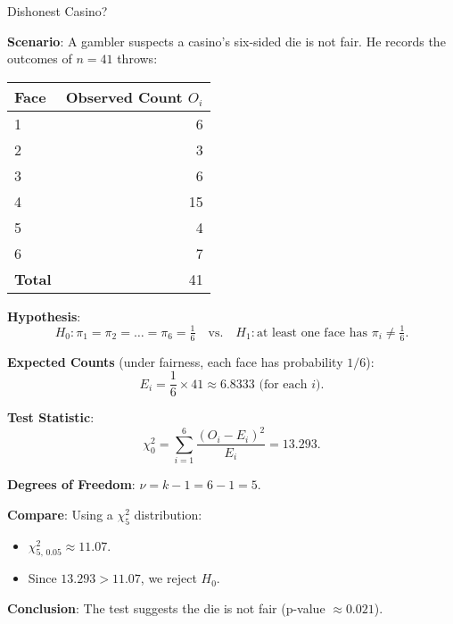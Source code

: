 \documentclass[10pt, total={6in, 8in}]{extarticle}
\begin{document}
\begin{examplebox}{Dishonest Casino?}{}

    \textbf{Scenario}: A gambler suspects a casino's six-sided die is not fair. He records the outcomes of $n=41$ throws:

    \begin{center}
        \begin{tabular}{lr}
            \toprule
            Face           & Observed Count $O_i$ \\
            \midrule
            1              & 6                    \\
            2              & 3                    \\
            3              & 6                    \\
            4              & 15                   \\
            5              & 4                    \\
            6              & 7                    \\
            \midrule
            \textbf{Total} & 41                   \\
            \bottomrule
        \end{tabular}
    \end{center}

    \textbf{Hypothesis}:
    \[
        H_0:
        \pi_1 = \pi_2 = \dots = \pi_6 = \tfrac{1}{6}
        \quad
        \text{vs.}
        \quad
        H_1:
        \text{at least one face has }\pi_i \neq \tfrac{1}{6}.
    \]

    \textbf{Expected Counts} (under fairness, each face has probability $1/6$):
    \[
        E_i = \frac{1}{6} \times 41 \approx 6.8333 \text{ (for each }i).
    \]

    \textbf{Test Statistic}:
    \[
        \chi^2_0
        = \sum_{i=1}^{6} \frac{(O_i - E_i)^2}{E_i}
        = 13.293.
    \]

    \textbf{Degrees of Freedom}: $\nu = k-1 = 6 - 1 = 5$.

    \textbf{Compare}: Using a $\chi^2_5$ distribution:
    \begin{itemize}
        \item $\chi^2_{5,\,0.05} \approx 11.07$.
        \item Since $13.293 > 11.07$, we reject $H_0$.
    \end{itemize}

    \textbf{Conclusion}: The test suggests the die is not fair (p-value $\approx 0.021$).
\end{examplebox}
\end{document}
